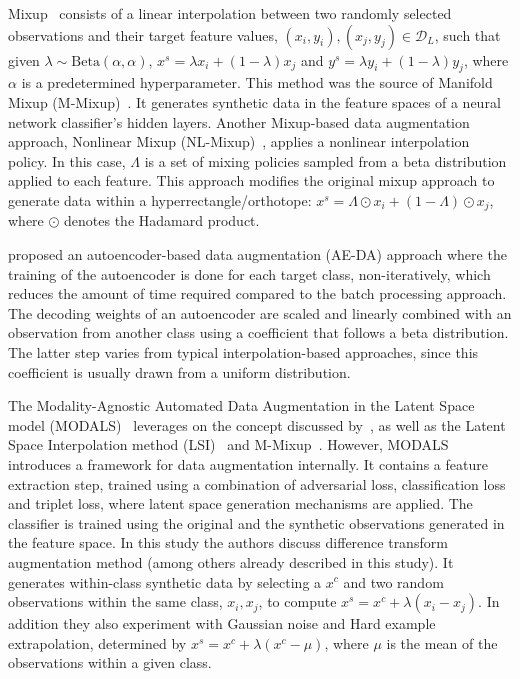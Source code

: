 \documentclass[parskip=full]{scrartcl}
\begin{document}
Mixup~\cite{zhang2018mixup} consists of a linear interpolation between two
randomly selected observations and their target feature values, $(x_i, y_i),
(x_j, y_j) \in \mathcal{D}_L$, such that given $\lambda \sim
\text{Beta}(\alpha,\alpha)$, $x^s = \lambda x_i + (1-\lambda) x_j$ and $y^s =
\lambda y_i + (1-\lambda) y_j$, where $\alpha$ is a predetermined
hyperparameter. This method was the source of Manifold Mixup
(M-Mixup)~\cite{verma2019manifold}. It generates synthetic data in the feature
spaces of a neural network classifier's hidden layers. Another Mixup-based
data augmentation approach, Nonlinear Mixup
(NL-Mixup)~\cite{guo2020nonlinear}, applies a nonlinear interpolation policy.
In this case, $\Lambda$ is a set of mixing policies sampled from a beta
distribution applied to each feature. This approach modifies the original
mixup approach to generate data within a hyperrectangle/orthotope: $x^s =
\Lambda \odot x_i + (1-\Lambda) \odot x_j$, where $\odot$ denotes the Hadamard
product.

\citet{feng2020autuencoder} proposed an autoencoder-based data augmentation
(AE-DA) approach where the training of the autoencoder is done for each target
class, non-iteratively, which reduces the amount of time required compared to
the batch processing approach. The decoding weights of an autoencoder are
scaled and linearly combined with an observation from another class using a
coefficient that follows a beta distribution. The latter step varies from
typical interpolation-based approaches, since this coefficient is usually
drawn from a uniform distribution.

The Modality-Agnostic Automated Data Augmentation in the Latent Space model
(MODALS)~\cite{cheung2020modals} leverages on the concept discussed
by~\citet{devries2017dataset}, as well as the Latent Space Interpolation
method (LSI)~\cite{liu2018data} and M-Mixup~\cite{verma2019manifold}.
However, MODALS introduces a framework for data augmentation internally. It
contains a feature extraction step, trained using a combination of adversarial
loss, classification loss and triplet loss, where latent space generation
mechanisms are applied. The classifier is trained using the original and the
synthetic observations generated in the feature space. In this study the
authors discuss difference transform augmentation method (among others already
described in this study). It generates within-class synthetic data by
selecting a $x^c$ and two random observations within the same class, $x_i,
x_j$, to compute $x^s = x^c + \lambda (x_i-x_j)$. In addition they also
experiment with Gaussian noise and Hard example extrapolation, determined by
$x^s = x^c + \lambda (x^c-\mu)$, where $\mu$ is the mean of the observations
within a given class.
\end{document}
